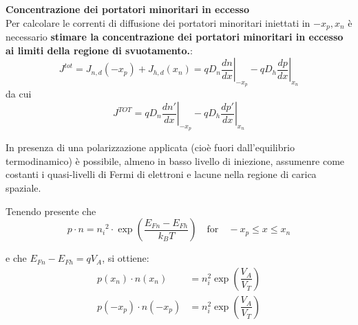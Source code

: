 %
\textbf{Concentrazione dei portatori minoritari in eccesso}\\
Per calcolare le correnti di diffusione dei portatori minoritari iniettati in $-x_p,x_n$ è necessario \textbf{stimare la concentrazione dei portatori minoritari in eccesso ai limiti della regione di svuotamento.}:
\begin{equation}
    J^{tot}=J_{n,d}(-x_p)+J_{h,d}(x_n) = qD_n \left. \dfrac{dn}{dx}\right|_{-x_p} -qD_h \left. \dfrac{dp}{dx}\right|_{x_n}
\end{equation}
da cui
\begin{equation}
    J^{TOT}= qD_n \left. \dfrac{dn'}{dx}\right|_{-x_p} -qD_h \left. \dfrac{dp'}{dx}\right|_{x_n}
\end{equation}

In presenza di una polarizzazione applicata (cioè fuori dall'equilibrio termodinamico) è possibile, almeno in basso livello di iniezione, assumenre come costanti i quasi-livelli di Fermi di elettroni e lacune nella regione di carica spaziale.

Tenendo presente che
\begin{equation}
    p \cdot n = {n_i}^2 \cdot \exp\left( \dfrac{E_{Fn} - E_{Fh}}{k_B T} \right) \quad \text{for} \quad -x_p \leq x \leq x_n
\end{equation}

 e che $E_{Fn}-E_{Fh}=qV_A$, si ottiene:
\begin{align}
    p(x_n)\cdot n(x_n)&=n_i^2 \exp\left( \dfrac{V_A}{V_T}\right)\\
    p(-x_p)\cdot n(-x_p)&=n_i^2 \exp\left( \dfrac{V_A}{V_T}\right)
\end{align}

